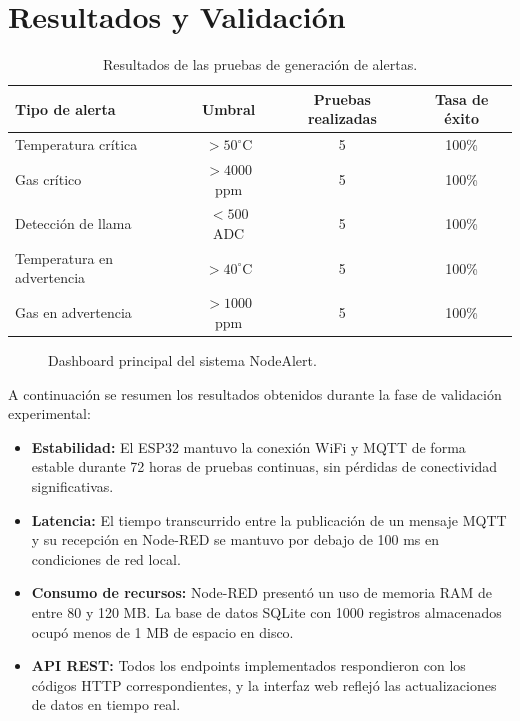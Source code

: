 \documentclass[11pt,a4paper]{article}
\begin{document}
\section{Resultados y Validaci\'on}

\begin{table}[H]
    \centering
    \caption{Resultados de las pruebas de generaci\'on de alertas.}
    \label{tab:alertas}
    \begin{tabular}{lccc}
        \toprule
        \textbf{Tipo de alerta} & \textbf{Umbral} & \textbf{Pruebas realizadas} & \textbf{Tasa de \'exito} \\
        \midrule
        Temperatura cr\'itica & $>50^{\circ}$C & 5 & 100\% \\
        Gas cr\'itico & $>4000$ ppm & 5 & 100\% \\
        Detecci\'on de llama & $<500$ ADC & 5 & 100\% \\
        Temperatura en advertencia & $>40^{\circ}$C & 5 & 100\% \\
        Gas en advertencia & $>1000$ ppm & 5 & 100\% \\
        \bottomrule
    \end{tabular}
\end{table}

\begin{figure}[H]
    \centering
    \caption{Dashboard principal del sistema NodeAlert.}
    \label{fig:dashboard}
\end{figure}

A continuaci\'on se resumen los resultados obtenidos durante la fase de validaci\'on experimental:

\begin{itemize}
    \item \textbf{Estabilidad:} El ESP32 mantuvo la conexi\'on WiFi y MQTT de forma estable durante 72 horas de pruebas continuas, sin p\'erdidas de conectividad significativas.
    \item \textbf{Latencia:} El tiempo transcurrido entre la publicaci\'on de un mensaje MQTT y su recepci\'on en Node-RED se mantuvo por debajo de 100 ms en condiciones de red local.
    \item \textbf{Consumo de recursos:} Node-RED present\'o un uso de memoria RAM de entre 80 y 120 MB. La base de datos SQLite con 1000 registros almacenados ocup\'o menos de 1 MB de espacio en disco.
    \item \textbf{API REST:} Todos los endpoints implementados respondieron con los c\'odigos HTTP correspondientes, y la interfaz web reflej\'o las actualizaciones de datos en tiempo real.
\end{itemize}
\end{document}
